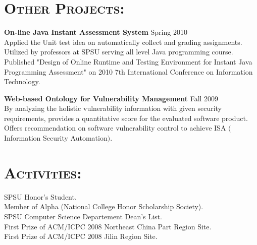 \begin{resume}
\section{\textsc{Other Projects:}}
\textbf{\newline On-line Java Instant Assessment System} \hfill Spring 2010\\
Applied the Unit test idea on automatically collect and grading assignments. Utilized by professors at SPSU serving all level Java programming course. \\
Published "Design of Online Runtime and Testing Environment for Instant Java Programming Assessment" on 2010 7th International Conference on Information Technology.

\textbf{Web-based Ontology for Vulnerability Management} \hfill Fall 2009\\
By analyzing the holistic vulnerability information with given security requirements, 
provides a quantitative score for the evaluated software product.\\
Offers recommendation on software vulnerability control to achieve ISA $($Information
Security Automation$)$.



\section{\textsc{Activities:}} 
\textbf{\newline}
SPSU Honor’s Student. \\
Member of Alpha (National College Honor Scholarship Society).  \\
SPSU Computer Science Departement Dean's List.\\
First Prize of ACM/ICPC 2008 Northeast China Part Region Site.	\\
First Prize of ACM/ICPC 2008 Jilin Region Site. 





\end{resume}

